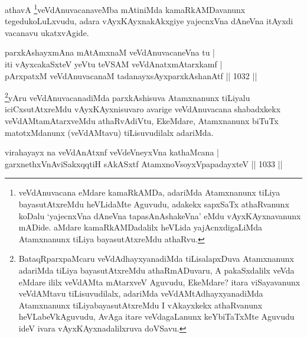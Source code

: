 \begin{artha}
athavA \footnote{veVdAnuvacana eMdare kamaRkAMDa, adariMda Atamxnanunx tiLiya bayasutAtxreMdu heVLidaMte Aguvudu, adakekx sapxSaTx athaRvanunx koDalu `yajecnxVna dAneVna tapasA\s nAshakeVna' eMdu vAyxKAyxnavanunx mADide. aMdare kamaRkAMDadalilx heVLida yajAcnxdigaLiMda Atamxnanunx tiLiya bayasutAtxreMdu athaRvu.}veVdAnuvacanaveMba mAtiniMda kamaRkAMDavanunx tegedukoLuLxvudu, adara vAyxKAyxnakAkxgiye yajecnxVna dAneVna itAyxdi vacanavu ukatxvAgide.
\end{artha}


\begin{shl}
parxkAshayxmAna mAtAmxnaM veVdAnuvacaneVna tu |\\
iti vAyxcakaSxteV yeVtu teVSAM veVdAnatxmAtarxkamf |\\
pArxpatxM veVdAnuvacanaM tadanayxsAyxparxkAshanAtf \hfill || 1032 ||
\end{shl}

\begin{artha}
\footnote{BataqRparxpaMcaru veVdAdhayxyanadiMda tiLisalapxDuva Atamxnanunx adariMda tiLiya bayasutAtxreMdu athaRmADuvaru, A pakaSxdalilx veVda eMdare ililx veVdAMta mAtarxveV Aguvudu, EkeMdare? itara viSayavanunx veVdAMtavu tiLisuvudilalx, adariMda veVdAMtAdhayxyanadiMda Atamxnanunx tiLiyabayasutAtxreMdu I vAkayxkekx athaRvanunx heVLabeVkAguvudu, AvAga itare veVdagaLanunx keYbiTaTxMte Aguvudu ideV ivara vAyxKAyxnadalilxruva doVSavu.}yAru veVdAnuvacanadiMda parxkAshisuva Atamxnanunx tiLiyalu iciCxsutAtxreMdu vAyxKAyxnisuvaro avarige veVdAnuvacana shabadxkekx veVdAMtamAtarxveMdu athaRvAdiVtu, EkeMdare, Atamxnanunx biTuTx matotxMdanunx (veVdAMtavu) tiLisuvudilalx adariMda.
\end{artha}





\begin{shl}
virahayayx na veVdAnAtxnf veVdeV\s neyxVna kathaMcana |
garxnethxVnA\s\s viSakxqqtiH sAkASxtf AtamxnoV\s soyxVpapadayxteV || 1033 ||
\end{shl}

